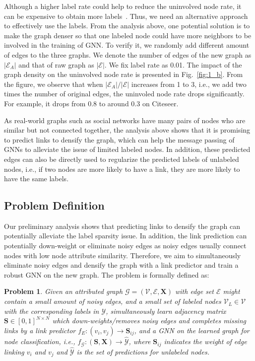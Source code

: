 Although a higher label rate could help to reduce the uninvolved node rate, it can be expensive to obtain more labels~\cite{gallagher2008leveraging}. Thus, we need an alternative approach to effectively use the labels. From the analysis above, one potential solution is to make the graph denser so that one labeled node could have more neighbors to be involved in the training of GNN. To verify it, we randomly add different amount of edges to the three graphs. We denote the number of edges of the new graph as $|\mathcal{E}_A|$ and that of raw graph as $|\mathcal{E}|$. We fix label rate as 0.01. The impact of the graph density on the uninvolved node rate is presented in Fig.~\ref{fig:1_b}. From the figure, we observe that when $|\mathcal{E}_A|/|\mathcal{E}|$ increases from 1 to 3, i.e., we add two times the number of original edges, the uninvoled node rate drops significantly. For example, it drops from 0.8 to around 0.3 on Citeseer. 

As real-world graphs such as social networks have many pairs of nodes who are similar but not connected together, the analysis above shows that it is promising to predict links to densify the graph, which can help the message passing of GNNs to alleviate the issue of limited labeled nodes. In addition, these predicted edges can also be directly used to regularize the predicted labels of unlabeled nodes, i.e., if two nodes are more likely to have a link, they are more likely to have the same labels.

\label{sec:3_3}
\subsection{Problem Definition}
Our preliminary analysis shows that predicting links to densify the graph can potentially alleviate the label sparsity issue.  In addition, the link prediction can potentially down-weight or eliminate noisy edges as noisy edges usually connect nodes with low node attribute similarity.
Therefore, we aim to simultaneously eliminate noisy edges and densify the graph with a link predictor and train a robust GNN on the new graph. The problem is formally defined as:
\newtheorem{problem}{Problem}
\begin{problem}
Given an attributed graph $\mathcal{G}=(\mathcal{V},\mathcal{E}, \mathbf{X})$ with edge set $\mathcal{E}$ might contain a small amount of noisy edges, and a small set of labeled nodes $\mathcal{V}_L \in \mathcal{V}$ with the corresponding labels in $\mathcal{Y}$, simultaneously learn adjacency matrix $\mathbf{S} \in [0,1]^{N \times N}$ which down-weights/removes noisy edges and completes missing links by a link predictor $f_E:(v_i,v_j) \rightarrow \mathbf{S}_{ij}$, and a GNN on the learned graph for node classification, i.e., $f_{\mathcal{G}}:(\mathbf{S}, \mathbf{X}) \rightarrow \hat{\mathcal{Y}}$, where $\mathbf{S}_{ij}$ indicates the weight of edge linking $v_i$ and $v_j$ and $\hat{\mathcal{Y}}$ is the set of predictions for unlabeled nodes.
\end{problem}
